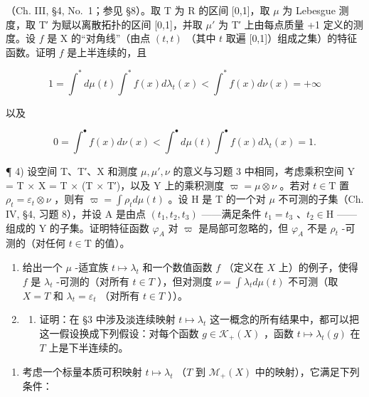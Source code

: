 （Ch. III, §4, No.~1；参见 §8）。取 T 为 R 的区间 {[}0,1{]}，取 \(\mu\) 为 Lebesgue 测度，取 T′ 为赋以离散拓扑的区间 {[}0,1{]}，并取 \(\mu'\) 为 T′ 上由每点质量 +1 定义的测度。设 \(f\) 是 X 的“对角线”（由点 \((t,t)\) （其中 \(t\) 取遍 {[}0,1{]}）组成之集）的特征函数。证明 \(f\) 是上半连续的，且

\[
1 = \int^ {*} d \mu (t) \int^ {*} f (x) d \lambda_ {t} (x) <   \int^ {*} f (x) d \nu (x) = + \infty
\]

以及

\[
0 = \int^ {\bullet} f (x) d \nu (x) <   \int^ {\bullet} d \mu (t) \int^ {\bullet} f (x) d \lambda_ {t} (x) = 1.
\]

¶ 4) 设空间 T、T′、X 和测度 \(\mu, \mu', \nu\) 的意义与习题 3 中相同，考虑乘积空间 Y = T × X = T × (T × T′)，以及 Y 上的乘积测度 \(\varpi = \mu \otimes \nu\) 。若对 \(t \in \mathrm{T}\) 置 \(\rho_t = \varepsilon_t \otimes \nu\) ，则有 \(\varpi = \int \rho_t d\mu(t)\) 。设 H 是 T 的一个对 \(\mu\) 不可测的子集（Ch. IV, §4, 习题 8），并设 A 是由点 \((t_1, t_2, t_3)\) ——满足条件 \(t_1 = t_3\) 、\(t_2 \in \mathrm{H}\) ——组成的 Y 的子集。证明特征函数 \(\varphi_A\) 对 \(\varpi\) 是局部可忽略的，但 \(\varphi_A\) 不是 \(\rho_t\) -可测的（对任何 \(t \in \mathrm{T}\) 的值）。

\begin{enumerate}
\def\labelenumi{\arabic{enumi})}
\setcounter{enumi}{4}
\item
  给出一个 \(\mu\) -适宜族 \(t \mapsto \lambda_t\) 和一个数值函数 \(f\) （定义在 \(X\) 上）的例子，使得 \(f\) 是 \(\lambda_t\) -可测的（对所有 \(t \in T\) ），但对测度 \(\nu = \int \lambda_t d\mu(t)\) 不可测（取 \(X = T\) 和 \(\lambda_t = \varepsilon_t\) （对所有 \(t \in T\) ））。
\item
  \begin{enumerate}
  \def\labelenumii{\alph{enumii})}
  \tightlist
  \item
    证明：在 §3 中涉及淡连续映射 \(t \mapsto \lambda_t\) 这一概念的所有结果中，都可以把这一假设换成下列假设：对每个函数 \(g \in \mathcal{K}_+(X)\) ，函数 \(t \mapsto \lambda_t(g)\) 在 \(T\) 上是下半连续的。
  \end{enumerate}
\end{enumerate}

\begin{enumerate}
\def\labelenumi{\alph{enumi})}
\setcounter{enumi}{1}
\tightlist
\item
  考虑一个标量本质可积映射 \(t \mapsto \lambda_t\) （\(T\) 到 \(\mathcal{M}_+(X)\) 中的映射），它满足下列条件：
\end{enumerate}

